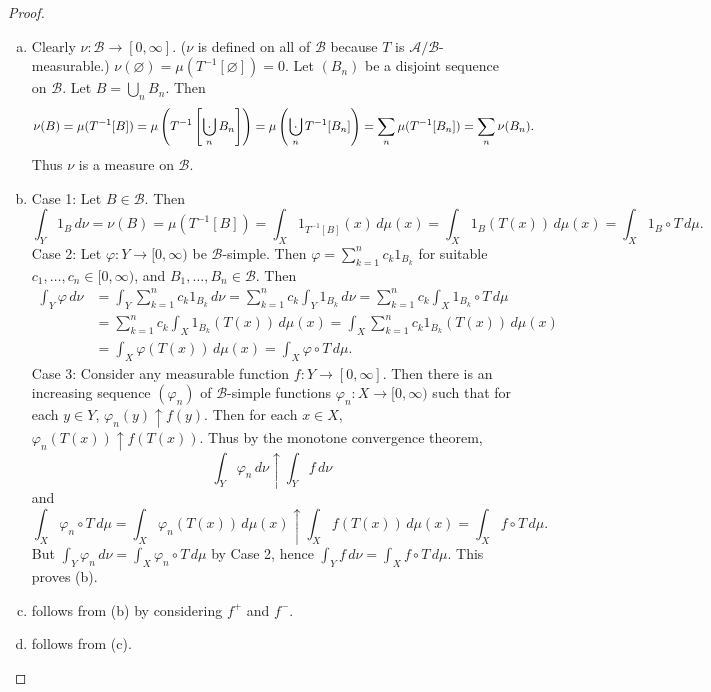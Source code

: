 \documentclass{article}
\newcommand{\bigcupdot}{\mathop{\mathchoice{\hspace{0.45em}}{\hspace{0.35em}}{}{}\cdot\mathchoice{\hspace{-0.85em}}{\hspace{-0.725em}}{}{}\bigcup\limits}}
\theoremstyle{definition}
\begin{document}
\begin{proof}
    \begin{enumerate}[(a)]
        \item Clearly $\nu : \mathscr{B} \longrightarrow [0,\infty]$. ($\nu$ is defined on all of $\mathscr{B}$ because $T$ is $\mathscr{A}/\mathscr{B}$-measurable.) $\nu(\varnothing) = \mu(T^{-1}[\varnothing]) = 0$. Let $(B_n)$ be a disjoint sequence on $\mathscr{B}$. Let $B = \bigcup_n B_n$. Then
        \[
            \nu(B) = \mu(T^{-1}[B]) = \mu\left(T^{-1}\left[\bigcupdot_n B_n\right]\right) = \mu\left(\bigcupdot_n T^{-1}[B_n]\right) = \sum_n \mu(T^{-1}[B_n]) = \sum_n \nu(B_n).
        \]
        Thus $\nu$ is a measure on $\mathscr{B}$.
        \item Case 1: Let $B \in \mathscr{B}$. Then
        \[
            \int_Y 1_B\,d\nu = \nu(B) = \mu(T^{-1}[B]) = \int_X 1_{T^{-1}[B]}(x)\,d\mu(x) = \int_X 1_B(T(x))\,d\mu(x) = \int_X 1_B \circ T\,d\mu.
        \]
        Case 2: Let $\varphi : Y \longrightarrow [0, \infty)$ be $\mathscr{B}$-simple. Then $\varphi = \sum_{k=1}^n c_k 1_{B_k}$ for suitable $c_1, \dots, c_n \in [0, \infty)$, and $B_1, \dots, B_n \in \mathscr{B}$. Then
        \begin{equation*}
            \begin{split}
                \int_Y \varphi\,d\nu &= \int_Y \sum_{k=1}^n c_k 1_{B_k}\,d\nu 
                = \sum_{k=1}^n c_k \int_Y 1_{B_k} \,d\nu
                = \sum_{k=1}^n c_k \int_X 1_{B_k} \circ T \,d\mu \\
                &= \sum_{k=1}^n c_k \int_X 1_{B_k}(T(x))\,d\mu(x)
                = \int_X \sum_{k=1}^n c_k 1_{B_k}(T(x))\,d\mu(x) \\
                &= \int_X \varphi(T(x))\,d\mu(x) = \int_X \varphi \circ T \,d\mu.
            \end{split}
        \end{equation*}
        Case 3: Consider any measurable function $f : Y \longrightarrow [0, \infty]$. Then there is an increasing sequence $(\varphi_n)$ of $\mathscr{B}$-simple functions $\varphi_n : X \longrightarrow [0, \infty)$ such that for each $y \in Y$, $\varphi_n(y) \uparrow f(y)$.
        Then for each $x \in X$, $\varphi_n(T(x)) \uparrow f(T(x))$. Thus by the monotone convergence theorem,
        \[
            \int_Y \varphi_n\,d\nu \uparrow \int_Y f\,d\nu
        \]
        and
        \[
            \int_X \varphi_n \circ T \,d\mu = \int_X \varphi_n(T(x))\,d\mu(x) \uparrow \int_X f(T(x))\,d\mu(x) = \int_X f \circ T\,d\mu.
        \]
        But $\int_Y \varphi_n\,d\nu = \int_X \varphi_n \circ T \,d\mu$ by Case 2, hence $\int_Y f\,d\nu = \int_X f \circ T\,d\mu$. This proves (b).
        \item follows from (b) by considering $f^+$ and $f^-$.
        \item follows from (c).
    \end{enumerate}
\end{proof}
\end{document}
